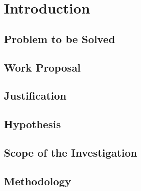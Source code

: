 
\chapter{Introduction}
\label{chp:chapter1}

\section{Problem to be Solved}

\section{Work Proposal}

\section{Justification}

\section{Hypothesis}

\section{Scope of the Investigation}

\section{Methodology}

